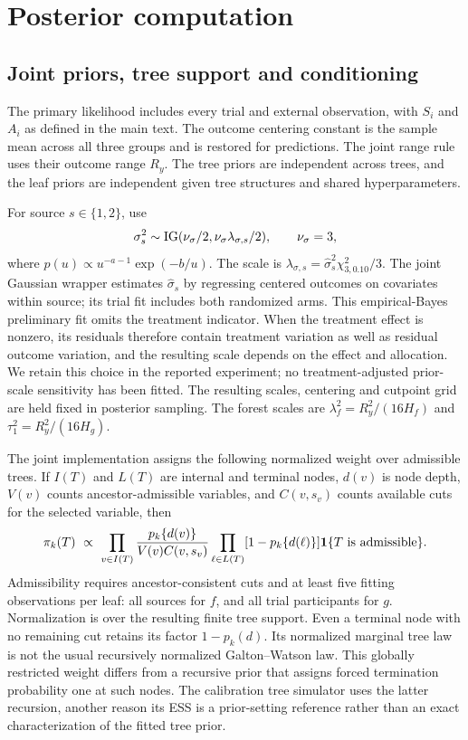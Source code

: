 \section{Posterior computation}\label{sec:A}
\subsection{Joint priors, tree support and conditioning}\label{sec:A.1}
The primary likelihood includes every trial and external observation, with $S_i$ and $A_i$ as defined in the main text. The outcome centering constant is the sample mean across all three groups and is restored for predictions. The joint range rule uses their outcome range $R_y$. The tree priors are independent across trees, and the leaf priors are independent given tree structures and shared hyperparameters.

For source $s\in\{1,2\}$, use
\[
\sigma_s^2\sim\operatorname{IG}(\nu_\sigma/2,\nu_\sigma\lambda_{\sigma,s}/2),\qquad \nu_\sigma=3,
\]
where $p(u)\propto u^{-a-1}\exp(-b/u)$. The scale is $\lambda_{\sigma,s}=\widehat\sigma_s^2\chi^2_{3,0.10}/3$. The joint Gaussian wrapper estimates $\widehat\sigma_s$ by regressing centered outcomes on covariates within source; its trial fit includes both randomized arms. This empirical-Bayes preliminary fit omits the treatment indicator. When the treatment effect is nonzero, its residuals therefore contain treatment variation as well as residual outcome variation, and the resulting scale depends on the effect and allocation. We retain this choice in the reported experiment; no treatment-adjusted prior-scale sensitivity has been fitted. The resulting scales, centering and cutpoint grid are held fixed in posterior sampling. The forest scales are $\lambda_f^2=R_y^2/(16H_f)$ and $\tau_1^2=R_y^2/(16H_g)$.

The joint implementation assigns the following normalized weight over admissible trees. If $I(T)$ and $L(T)$ are internal and terminal nodes, $d(v)$ is node depth, $V(v)$ counts ancestor-admissible variables, and $C(v,s_v)$ counts available cuts for the selected variable, then
\begin{equation}\label{eq:treeweight}
\pi_k(T)\ \propto\
\prod_{v\in I(T)}\frac{p_k\{d(v)\}}{V(v)C(v,s_v)}
\prod_{\ell\in L(T)}[1-p_k\{d(\ell)\}]
\mathbf{1}\{T\text{ is admissible}\}.
\end{equation}
Admissibility requires ancestor-consistent cuts and at least five fitting observations per leaf: all sources for $f$, and all trial participants for $g$. Normalization is over the resulting finite tree support. Even a terminal node with no remaining cut retains its factor $1-p_k(d)$. Its normalized marginal tree law is not the usual recursively normalized Galton--Watson law. This globally restricted weight differs from a recursive prior that assigns forced termination probability one at such nodes. The calibration tree simulator uses the latter recursion, another reason its ESS is a prior-setting reference rather than an exact characterization of the fitted tree prior.

